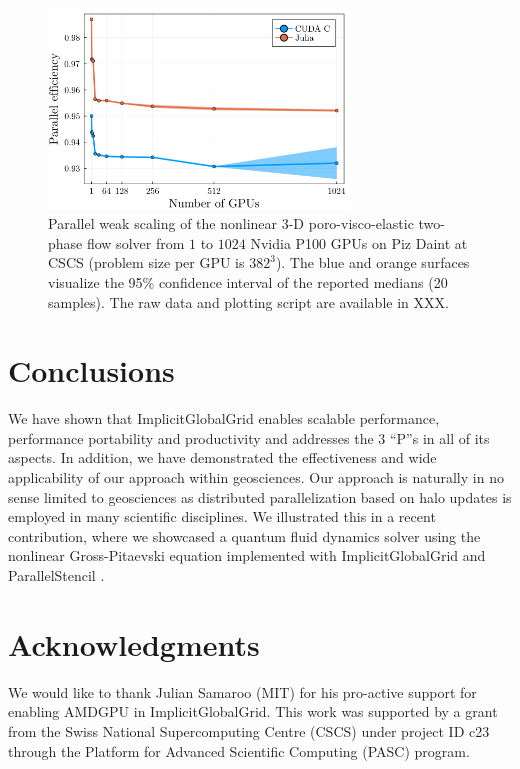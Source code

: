 \documentclass{juliacon}
\begin{document}
\begin{figure}[t]
    \centerline{\includegraphics[width=8cm]{julia_c_gpu_par_eff_lin.png}}
    \caption{Parallel weak scaling of the nonlinear 3-D poro-visco-elastic two-phase flow solver from $1$ to $1024$ Nvidia P100 GPUs on Piz Daint at CSCS (problem size per GPU is $382^\mathrm{3}$). The blue and orange surfaces visualize the 95\% confidence interval of the reported medians (20 samples). The raw data and plotting script are available in XXX.}
	\label{fig:weak_scaling_realworld}
\end{figure}

\section{Conclusions}
We have shown that ImplicitGlobalGrid enables scalable performance, performance portability and productivity and addresses the 3 ``P''s in all of its aspects. In addition, we have demonstrated the effectiveness and wide applicability of our approach within geosciences. Our approach is naturally in no sense limited to geosciences as distributed parallelization based on halo updates is employed in many scientific disciplines. We illustrated this in a recent contribution, where we showcased a quantum fluid dynamics solver using the nonlinear Gross-Pitaevski equation implemented with ImplicitGlobalGrid and ParallelStencil \cite{pasc21}.

\section{Acknowledgments}
We would like to thank Julian Samaroo (MIT) for his pro-active support for enabling AMDGPU in ImplicitGlobalGrid. This work was supported by a grant from the Swiss National Supercomputing Centre (CSCS) under project ID c23 through the Platform for Advanced Scientific Computing (PASC) program.


\end{document}
